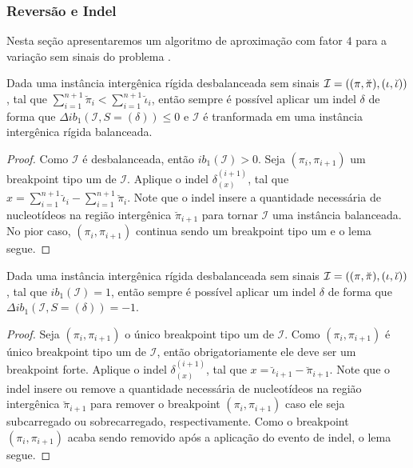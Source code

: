 \subsubsection{Reversão e Indel}

Nesta seção apresentaremos um algoritmo de aproximação com fator $4$ para a variação sem sinais do problema \SbIRI{}.

\begin{lemma}\label{lemma:QGOIQLZD}
Dada uma instância intergênica rígida desbalanceada sem sinais $\mathcal{I}=((\pi,\breve\pi),\break(\iota,\breve\iota))$, tal que $\sum_{i=1}^{n+1}\breve\pi_i < \sum_{i=1}^{n+1}\breve\iota_i$, então sempre é possível aplicar um indel $\delta$ de forma que $\Delta ib_1(\mathcal{I}, S=(\delta)) \le 0$ e $\mathcal{I}$ é tranformada em uma instância intergênica rígida balanceada.
\end{lemma}
\begin{proof}
Como $\mathcal{I}$ é desbalanceada, então $ib_1(\mathcal{I}) > 0$. Seja $(\pi_i,\pi_{i+1})$ um breakpoint tipo um de $\mathcal{I}$. Aplique o indel $\delta_{(x)}^{(i+1)}$, tal que $x = \sum_{i=1}^{n+1}\breve\iota_i - \sum_{i=1}^{n+1}\breve\pi_i$. Note que o indel insere a quantidade necessária de nucleotídeos na região intergênica $\breve\pi_{i+1}$ para tornar $\mathcal{I}$ uma instância balanceada. No pior caso, $(\pi_i,\pi_{i+1})$ continua sendo um breakpoint tipo um e o lema segue.
\end{proof}

\begin{lemma}\label{lemma:QNHGBLYF}
Dada uma instância intergênica rígida desbalanceada sem sinais $\mathcal{I}=((\pi,\breve\pi),\break(\iota,\breve\iota))$, tal que $ib_1(\mathcal{I}) = 1$, então sempre é possível aplicar um indel $\delta$ de forma que $\Delta ib_1(\mathcal{I}, S=(\delta)) = -1$.
\end{lemma}
\begin{proof}
Seja $(\pi_i,\pi_{i+1})$ o único breakpoint tipo um de $\mathcal{I}$. Como $(\pi_i,\pi_{i+1})$ é único breakpoint tipo um de $\mathcal{I}$, então obrigatoriamente ele deve ser um breakpoint forte. Aplique o indel $\delta_{(x)}^{(i+1)}$, tal que $x = \breve\iota_{i+1} - \breve\pi_{i+1}$. Note que o indel insere ou remove a quantidade necessária de nucleotídeos na região intergênica $\breve\pi_{i+1}$ para remover o breakpoint $(\pi_i,\pi_{i+1})$ caso ele seja subcarregado ou sobrecarregado, respectivamente. Como o breakpoint $(\pi_i,\pi_{i+1})$ acaba sendo removido após a aplicação do evento de indel, o lema segue.
\end{proof}

